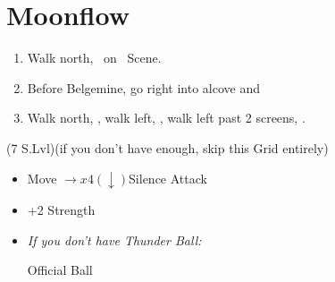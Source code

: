 \chapter{Moonflow}

\begin{enumerate}
	\item Walk north, \sd\ on \kimahri\ Scene.
	\item Before Belgemine, go right into alcove and 
	\item Walk north, \sd, walk left, \sd, walk left past 2 screens, \sd.
\end{enumerate}
\begin{spheregrid}
	\begin{itemize}
		\wakkaf (7 S.Lvl)(if you don't have enough, skip this Grid entirely)
		\begin{itemize}
			\item Move $\rightarrow x4 (\downarrow)$Silence Attack
			\item +2 Strength
		\end{itemize}
	\end{itemize}
\end{spheregrid}
\begin{equip}
    \begin{itemize}
    	\item \textit{If you don't have Thunder Ball:}
	\begin{itemize}
	\wakkaf Official Ball
	\end{itemize}
    \end{itemize}
\end{equip}
